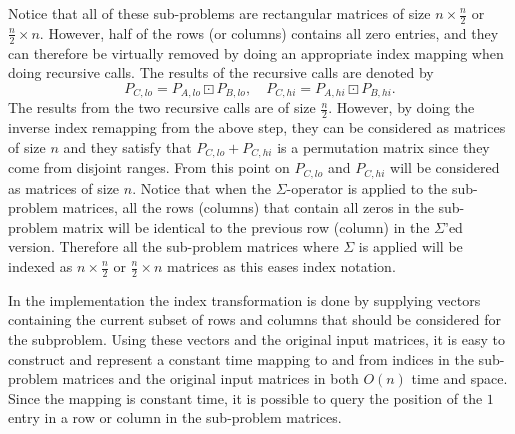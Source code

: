 \documentclass[twoside,11pt,openright]{report}
\begin{document}
Notice that all of these sub-problems are rectangular matrices of size $n \times \frac{n}{2}$ or $\frac{n}{2} \times n$. However, half of the rows (or columns) contains all zero entries, and they can therefore be virtually removed by doing an appropriate index mapping when doing recursive calls. The results of the recursive calls are denoted by
\[
  P_{C,lo} = P_{A,lo} \boxdot P_{B,lo}, \quad P_{C,hi} = P_{A,hi} \boxdot P_{B,hi}.
\]
The results from the two recursive calls are of size $\frac{n}{2}$. However, by doing the inverse index remapping from the above step, they can be considered as matrices of size $n$ and they satisfy that $P_{C,lo} + P_{C,hi}$ is a permutation matrix since they come from disjoint ranges. From this point on $P_{C,lo}$ and $P_{C,hi}$ will be considered as matrices of size $n$. Notice that when the $\Sigma$-operator is applied to the sub-problem matrices, all the rows (columns) that contain all zeros in the sub-problem matrix will be identical to the previous row (column) in the $\Sigma$'ed version. Therefore all the sub-problem matrices where $\Sigma$ is applied will be indexed as $n \times \frac{n}{2}$ or $\frac{n}{2} \times n$ matrices as this eases index notation.

In the implementation the index transformation is done by supplying vectors containing the current subset of rows and columns that should be considered for the subproblem. Using these vectors and the original input matrices, it is easy to construct and represent a constant time mapping to and from indices in the sub-problem matrices and the original input matrices in both $O(n)$ time and space. Since the mapping is constant time, it is possible to query the position of the $1$ entry in a row or column in the sub-problem matrices.
\end{document}
